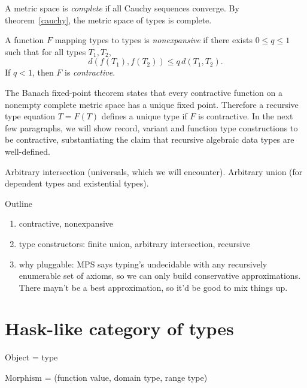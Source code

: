 \documentclass{amsart}
\begin{document}

A metric space is \emph{complete} if all Cauchy sequences
converge. By theorem~\ref{cauchy}, the metric space of types is
complete.

A function $F$ mapping types to types is \emph{nonexpansive} if
there exists $0\le q\le1$ such that for all types $T_1,T_2$,
\[
d(f(T_1), f(T_2)) \le q \, d(T_1, T_2).
\]
If $q<1$, then $F$ is \emph{contractive}.

The Banach fixed-point theorem states that every contractive
function on a nonempty complete metric space has a unique fixed
point. Therefore a recursive type equation $T=F(T)$ defines a
unique type if $F$ is contractive. In the next few paragraphs, we
will show record, variant and function type constructions to be
contractive, substantiating the claim that recursive algebraic
data types are well-defined.



Arbitrary intersection (universals, which we will encounter).
Arbitrary union (for dependent types and existential types).

%



Outline
\begin{enumerate}
\item contractive, nonexpansive
\item type constructors: finite union, arbitrary intersection,
recursive
\item why pluggable: MPS says typing's undecidable with any
recursively enumerable set of axioms, so we can only build
conservative approximations. There mayn't be a best
approximation, so it'd be good to mix things up.
\end{enumerate}


\section{Hask-like category of types}

\label{domain-theory-ends}

Object = type

Morphism = (function value, domain type, range type)
\end{document}
